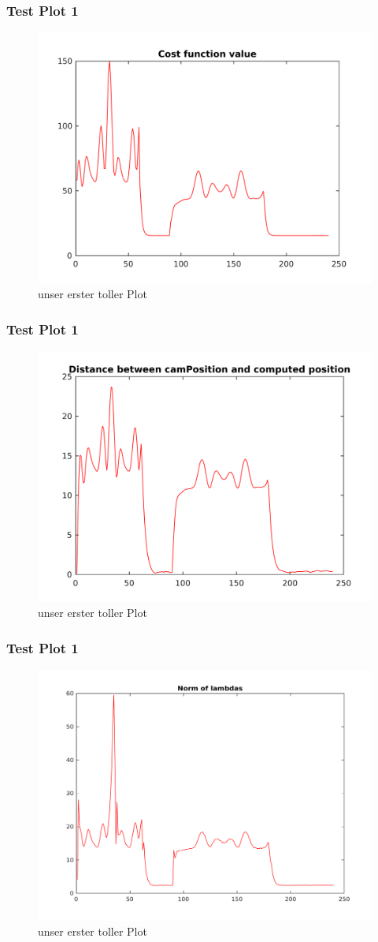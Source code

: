 \begin{frame}
	\frametitle{Test Plot 1}
	\begin{figure}%
	\includegraphics[width=0.75\columnwidth]{images/costF}%
	\caption{unser erster toller Plot}
	\end{figure}
\end{frame}

\begin{frame}
	\frametitle{Test Plot 1}
	\begin{figure}%
	\includegraphics[width=0.75\columnwidth]{images/norm_t}%
	\caption{unser erster toller Plot}
	\end{figure}
\end{frame}

\begin{frame}
	\frametitle{Test Plot 1}
	\begin{figure}%
	\includegraphics[width=0.75\columnwidth]{images/norm_lambda}%
	\caption{unser erster toller Plot}
	\end{figure}
\end{frame}

